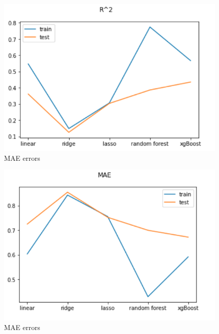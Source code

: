 \documentclass[a4paper]{article}
\begin{document}
\begin{figure}[h!]
\begin{center}
\includegraphics[scale=0.36]{r2.png}
\caption{MAE errors}
\label{fig:runtime}
\end{center}
\end{figure}

\begin{figure}[h!]
\begin{center}
\includegraphics[scale=0.36]{mae.png}
\caption{MAE errors}
\label{fig:runtime}
\end{center}
\end{figure}
\end{document}
